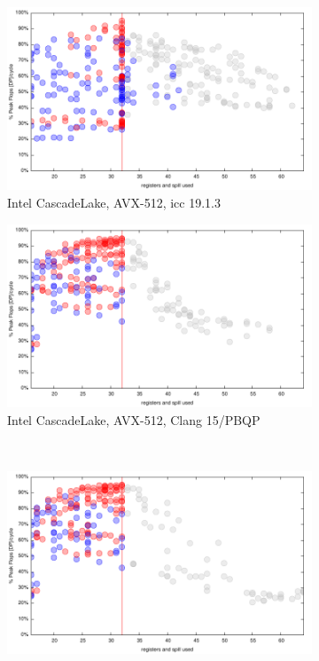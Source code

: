 \documentclass{article}
\begin{document}
\begin{figure}[h!]
  \begin{subfigure}[h!]{0.45\textwidth}  
\includegraphics[width=\textwidth]{../benches/gemm/cascadelake-64x256x64/icc-19.1.3.pdf}
  \caption{Intel CascadeLake, AVX-512, icc 19.1.3}
  \end{subfigure}
  \begin{subfigure}[h!]{0.45\textwidth}  
\includegraphics[width=\textwidth]{../benches/gemm/cascadelake-64x256x64/pbqp.pdf}
  \caption{Intel CascadeLake, AVX-512, Clang 15/PBQP}
  \end{subfigure}\\
  \begin{subfigure}[h!]{0.45\textwidth}  
\includegraphics[width=\textwidth]{../benches/gemm/cascadelake-64x256x64/greedy.pdf}

\end{subfigure}
\end{figure}
\end{document}
